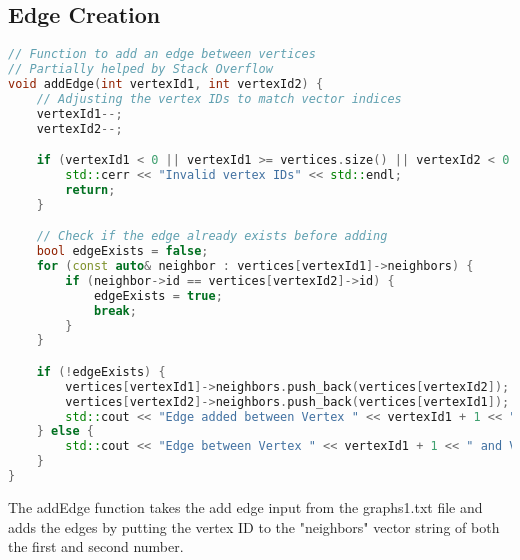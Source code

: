 \documentclass[letterpaper, 10pt,DIV=13]{scrartcl}
\numberwithin{equation}{section} %
\numberwithin{figure}{section} %
\numberwithin{table}{section} %
\begin{document}
\subsection{Edge Creation}
\begin{lstlisting}[language=c++, caption= Adding edges between vertices]
// Function to add an edge between vertices
// Partially helped by Stack Overflow
void addEdge(int vertexId1, int vertexId2) {
    // Adjusting the vertex IDs to match vector indices
    vertexId1--;
    vertexId2--;

    if (vertexId1 < 0 || vertexId1 >= vertices.size() || vertexId2 < 0 || vertexId2 >= vertices.size()) {
        std::cerr << "Invalid vertex IDs" << std::endl;
        return;
    }

    // Check if the edge already exists before adding
    bool edgeExists = false;
    for (const auto& neighbor : vertices[vertexId1]->neighbors) {
        if (neighbor->id == vertices[vertexId2]->id) {
            edgeExists = true;
            break;
        }
    }

    if (!edgeExists) {
        vertices[vertexId1]->neighbors.push_back(vertices[vertexId2]);
        vertices[vertexId2]->neighbors.push_back(vertices[vertexId1]);
        std::cout << "Edge added between Vertex " << vertexId1 + 1 << " and Vertex " << vertexId2 + 1 << std::endl;
    } else {
        std::cout << "Edge between Vertex " << vertexId1 + 1 << " and Vertex " << vertexId2 + 1 << " already exists" << std::endl;
    }
}
\end{lstlisting}
The addEdge function takes the add edge input from the graphs1.txt file and adds the edges by putting the vertex ID to the "neighbors" vector string of both the first and second number. 
\pagebreak
\end{document}
